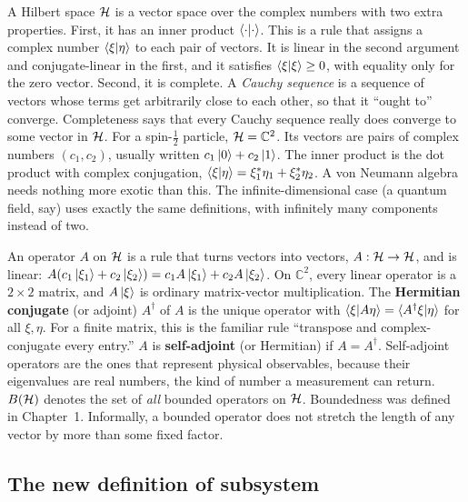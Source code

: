 A Hilbert space $\mathcal{H}$ is a vector space over the complex numbers with two extra properties. First, it has an
inner product $\braket{\cdot|\cdot}$. This is a rule that assigns a complex number $\braket{\xi|\eta}$ to each
pair of vectors. It is linear in the second argument and conjugate-linear in the first, and it satisfies
$\braket{\xi|\xi}\ge0$, with equality only for the zero vector. Second, it is complete. A \emph{Cauchy
sequence} is a sequence of vectors whose terms get arbitrarily close to each other, so that it ``ought to''
converge. Completeness says that every Cauchy sequence really does converge to some vector in $\mathcal{H}$. For a
spin-$\tfrac12$ particle, $\mathcal{H}=\mathbb C^2$. Its vectors are pairs of complex numbers $(c_1,c_2)$, usually
written $c_1\ket0+c_2\ket1$. The inner product is the dot product with complex conjugation,
$\braket{\xi|\eta}=\xi_1^*\eta_1+\xi_2^*\eta_2$. A von Neumann algebra needs nothing more exotic than this.
The infinite-dimensional case (a quantum field, say) uses exactly the same definitions, with infinitely many
components instead of two.

An operator $A$ on $\mathcal{H}$ is a rule that turns vectors into vectors, $A:\mathcal{H}\to\mathcal{H}$, and is linear:
$A(c_1\ket{\xi_1}+c_2\ket{\xi_2})=c_1 A\ket{\xi_1}+c_2A\ket{\xi_2}$. On $\mathbb C^2$, every linear operator is
a $2\times2$ matrix, and $A\ket\xi$ is ordinary matrix-vector multiplication. The \textbf{Hermitian
conjugate} (or adjoint) $A^\dagger$ of $A$ is the unique operator with
$\braket{\xi|A\eta}=\braket{A^\dagger\xi|\eta}$ for all $\xi,\eta$. For a finite matrix, this is the familiar
rule ``transpose and complex-conjugate every entry.'' $A$ is \textbf{self-adjoint} (or Hermitian) if
$A=A^\dagger$. Self-adjoint operators are the ones that represent physical observables, because their
eigenvalues are real numbers, the kind of number a measurement can return. $B(\mathcal{H})$ denotes the set of
\emph{all} bounded operators on $\mathcal{H}$. Boundedness was defined in Chapter~1. Informally, a bounded operator
does not stretch the length of any vector by more than some fixed factor.

\subsection*{The new definition of subsystem}

